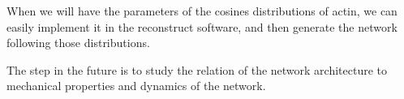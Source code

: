  When we will have the parameters of the cosines distributions of actin, we
can easily implement it in the reconstruct software, and then generate
the network following those distributions.

The step in the future is to study the relation of the network architecture to
mechanical properties and dynamics of the network.

\begin{figure}[h!]
  \begin{center}
\end{center}
\end{figure}
